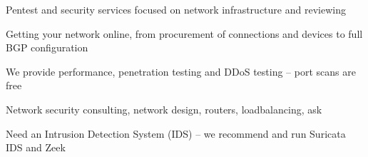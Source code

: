\documentclass[12pt]{foils}
\begin{document}
{}

\LogoOn



\begin{list2}
\item  Pentest and security services focused on network infrastructure and reviewing
\item Getting your network online, from procurement of connections and devices to full BGP configuration
\item We provide performance, penetration testing and DDoS testing -- port scans are free
\item Network security consulting, network design, routers, loadbalancing, ask
\item Need an Intrusion Detection System (IDS) -- we recommend and run Suricata IDS and Zeek
\end{list2}
\end{document}
